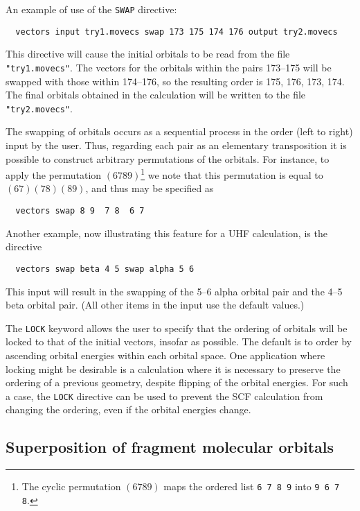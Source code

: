 An example of use of the \verb+SWAP+ directive:
\begin{verbatim}
  vectors input try1.movecs swap 173 175 174 176 output try2.movecs
\end{verbatim}
This directive will cause the initial orbitals to be read from the
file \verb+"try1.movecs"+.  The vectors for the orbitals within the
pairs 173--175 will be swapped with those within 174--176, so the
resulting order is 175, 176, 173, 174.  The final orbitals obtained in
the calculation will be written to the file \verb+"try2.movecs"+.

The swapping of orbitals occurs as a sequential process in the order
(left to right) input by the user.  Thus, regarding each pair as an
elementary transposition it is possible to construct arbitrary
permutations of the orbitals.  For instance, to apply the permutation
$(6 7 8 9)$\footnote{The cyclic permutation $(6 7 8 9)$ maps the
  ordered list \verb+6 7 8 9+ into \verb+9 6 7 8+.} we note that this
permutation is equal to $(6 7)(7 8)(8 9)$, and thus may be specified
as
\begin{verbatim}
  vectors swap 8 9  7 8  6 7
\end{verbatim}

Another example, now illustrating this feature for a UHF calculation,
is the directive
\begin{verbatim}
  vectors swap beta 4 5 swap alpha 5 6
\end{verbatim}
This input will result in the swapping of the 5--6 alpha orbital pair
and the 4--5 beta orbital pair.  (All other items in the input use the
default values.)

The \verb+LOCK+ keyword allows the user to specify that the ordering
of orbitals will be locked to that of the initial vectors, insofar as
possible. The default is to order by ascending orbital energies within
each orbital space. One application where locking might be desirable
is a calculation where it is necessary to preserve the ordering of a
previous geometry, despite flipping of the orbital energies.  For such
a case, the \verb+LOCK+ directive can be used to prevent the SCF
calculation from changing the ordering, even if the orbital energies
change.

\subsection{Superposition of fragment molecular orbitals}
\label{sec:fragguess}

